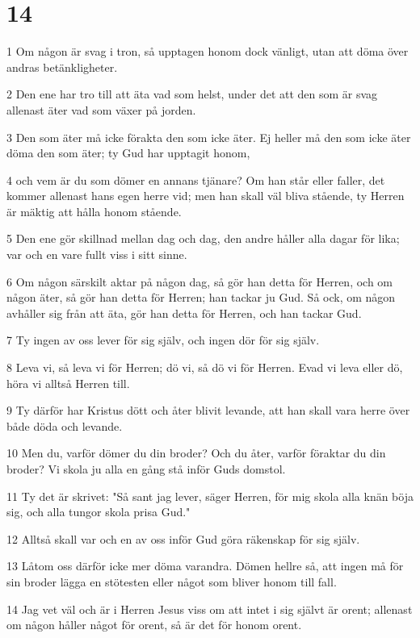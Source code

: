 \chapter{14}

\par 1 Om någon är svag i tron, så upptagen honom dock vänligt, utan att döma över andras betänkligheter.
\par 2 Den ene har tro till att äta vad som helst, under det att den som är svag allenast äter vad som växer på jorden.
\par 3 Den som äter må icke förakta den som icke äter. Ej heller må den som icke äter döma den som äter; ty Gud har upptagit honom,
\par 4 och vem är du som dömer en annans tjänare? Om han står eller faller, det kommer allenast hans egen herre vid; men han skall väl bliva stående, ty Herren är mäktig att hålla honom stående.
\par 5 Den ene gör skillnad mellan dag och dag, den andre håller alla dagar för lika; var och en vare fullt viss i sitt sinne.
\par 6 Om någon särskilt aktar på någon dag, så gör han detta för Herren, och om någon äter, så gör han detta för Herren; han tackar ju Gud. Så ock, om någon avhåller sig från att äta, gör han detta för Herren, och han tackar Gud.
\par 7 Ty ingen av oss lever för sig själv, och ingen dör för sig själv.
\par 8 Leva vi, så leva vi för Herren; dö vi, så dö vi för Herren. Evad vi leva eller dö, höra vi alltså Herren till.
\par 9 Ty därför har Kristus dött och åter blivit levande, att han skall vara herre över både döda och levande.
\par 10 Men du, varför dömer du din broder? Och du åter, varför föraktar du din broder? Vi skola ju alla en gång stå inför Guds domstol.
\par 11 Ty det är skrivet: "Så sant jag lever, säger Herren, för mig skola alla knän böja sig, och alla tungor skola prisa Gud."
\par 12 Alltså skall var och en av oss inför Gud göra räkenskap för sig själv.
\par 13 Låtom oss därför icke mer döma varandra. Dömen hellre så, att ingen må för sin broder lägga en stötesten eller något som bliver honom till fall.
\par 14 Jag vet väl och är i Herren Jesus viss om att intet i sig självt är orent; allenast om någon håller något för orent, så är det för honom orent.
